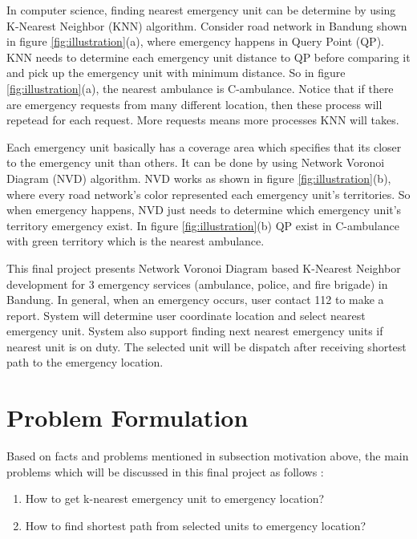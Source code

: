 In computer science, finding nearest emergency unit can be determine by using K-Nearest Neighbor (KNN) algorithm. Consider road network in Bandung shown in figure \ref{fig:illustration}(a), where emergency happens in Query Point (QP). KNN needs to determine each emergency unit distance to QP before comparing it and pick up the emergency unit with minimum distance. So in figure \ref{fig:illustration}(a), the nearest ambulance is C-ambulance. Notice that if there are emergency requests from many different location, then these process will repetead for each request. More requests means more processes KNN will takes.

Each emergency unit basically has a coverage area which specifies that its closer to the emergency unit than others. It can be done by using Network Voronoi Diagram (NVD) algorithm. NVD works as shown in figure \ref{fig:illustration}(b), where every road network's color represented each emergency unit's territories. So when emergency happens, NVD just needs to determine which emergency unit's territory emergency exist. In figure \ref{fig:illustration}(b) QP exist in C-ambulance with green territory which is the nearest ambulance.

This final project presents Network Voronoi Diagram based K-Nearest Neighbor development for 3 emergency services (ambulance, police, and fire brigade) in Bandung. In general, when an emergency occurs, user contact 112 to make a report. System will determine user coordinate location and select nearest emergency unit. System also support finding next nearest emergency units if nearest unit is on duty. The selected unit will be dispatch after receiving shortest path to the emergency location.

\pagebreak

\section{Problem Formulation}
Based on facts and problems mentioned in subsection motivation above, the main problems which will be discussed in this final project as follows :
\begin{enumerate}
	\item How to get k-nearest emergency unit to emergency location?
    \item How to find shortest path from selected units to emergency location?
\end{enumerate}

